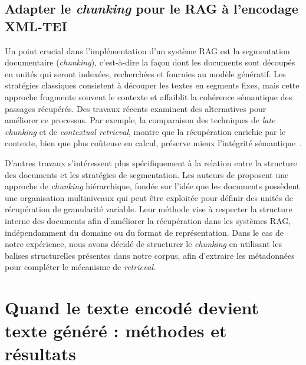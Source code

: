 \documentclass[final, fra]{anthology-ch}     %
\begin{document}
\subsection{Adapter le \textit{chunking} pour le RAG à l’encodage XML-TEI}
Un point crucial dans l’implémentation d’un système RAG est la segmentation documentaire (\textit{chunking}), c’est-à-dire la façon dont les documents sont découpés en unités qui seront indexées, recherchées et fournies au modèle génératif. Les stratégies classiques consistent à découper les textes en segments fixes, mais cette approche fragmente souvent le contexte et affaiblit la cohérence sémantique des passages récupérés. Des travaux récents examinent des alternatives pour améliorer ce processus. Par exemple, la comparaison des techniques de \textit{late chunking} et de \textit{contextual retrieval}, montre que la récupération enrichie par le contexte, bien que plus coûteuse en calcul, préserve mieux l’intégrité sémantique~\cite{merola_reconstructing_2025}.

D’autres travaux s’intéressent plus spécifiquement à la relation entre la structure des documents et les stratégies de segmentation. Les auteurs de \cite{lu_hichunk_2025} proposent une approche de \textit{chunking} hiérarchique, fondée sur l’idée que les documents possèdent une organisation multiniveaux qui peut être exploitée pour définir des unités de récupération de granularité variable. Leur méthode vise à respecter la structure interne des documents afin d’améliorer la récupération dans les systèmes RAG, indépendamment du domaine ou du format de représentation.
Dans le cas de notre expérience, nous avons décidé de structurer le \textit{chunking} en utilisant les balises structurelles présentes dans notre corpus, afin d’extraire les métadonnées pour compléter le mécanisme de \textit{retrieval}.

\section{Quand le texte encodé devient texte généré : méthodes et résultats}
\end{document}

